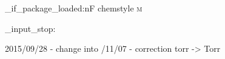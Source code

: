 %
%
%
%
%

\RequirePackage{siunitx}

\DeclareSIUnit {}
\DeclareSIUnit {}
\DeclareSIUnit {}
\DeclareSIUnit {}
\DeclareSIUnit \moLar      {\mole\per\liter}
\DeclareSIUnit \MolMass    {\gram\per\mole}
\DeclareSIUnit {}

  \DeclareSIUnit {}
\EndChemCompatibility

  \DeclareSIUnit {}
\EndChemCompatibility

  \DeclareSIUnit {}
\EndChemCompatibility

\AtEndPreamble
  {
    \chemmacros_if_package_loaded:nF {chemstyle}
      {
        \DeclareSIUnit {\cmc  } {\cubic\centi\metre}
        \DeclareSIUnit {\molar} {\mole\per\cubic\deci\metre}
        \DeclareSIUnit {\Molar} {\textsc{m}}
      }
  }

\file_input_stop:

2015/09/28 - change \AtBeginDocument into /11/07 - correction torr -> Torr

